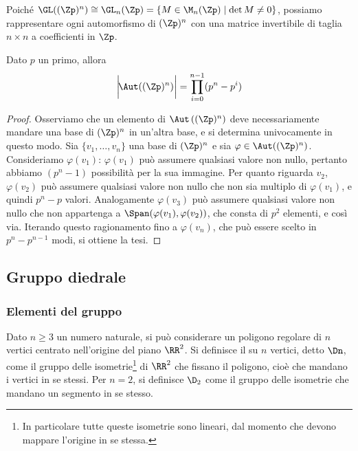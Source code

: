 \documentclass[11pt]{scrartcl}
\begin{document}
	Poiché $\GL((\Zp)^n) \cong \GL_n(\Zp) = \{M \in \M_{n}(\Zp)\mid \det M \neq 0\}$,
	possiamo rappresentare ogni automorfismo di $(\Zp)^n$ con una matrice invertibile
	di taglia $n\times n$ a coefficienti in $\Zp$.
	
	\begin{proposition}
		Dato $p$ un primo, allora \[
		\bigg| \! \Aut((\Zp)^n) \bigg| = \prod_{i = 0}^{n - 1} (p^n - p^i)
		\]
	\end{proposition}
	
	\begin{proof}
		Osserviamo che un elemento di $\Aut\left((\Zp)^n\right)$ deve necessariamente mandare 
		una base di $(\Zp)^n$ in un'altra base, e si determina univocamente in questo 
		modo. Sia $\{v_1, \ldots, v_n\}$ una base di $(\Zp)^n$ e sia $\varphi \in 
		\Aut((\Zp)^n)$. Consideriamo $\varphi(v_1)$: $\varphi(v_1)$ può assumere
		qualsiasi valore non nullo, pertanto abbiamo $(p^n - 1)$ possibilità per 
		la sua immagine. Per quanto riguarda $v_2$, $\varphi(v_2)$
		può assumere qualsiasi valore non nullo che non sia multiplo di $\varphi(v_1)$, e quindi
		$p^n - p$ valori. Analogamente $\varphi(v_3)$ può assumere qualsiasi
		valore non nullo che non appartenga a $\Span(\varphi(v_1), \varphi(v_2))$, che consta di
		$p^2$ elementi, e così via. Iterando questo ragionamento fino a $\varphi(v_n)$,
		che può essere scelto in $p^n - p^{n - 1}$ modi, si ottiene la tesi.
	\end{proof}
	
	\newpage
	
	\subsection{Gruppo diedrale}
	
	\subsubsection{Elementi del gruppo}
	
	\begin{definition}
		Dato $n \geq 3$ un numero naturale, si può considerare un poligono regolare di $n$ vertici centrato nell'origine del piano $\RR^2$. Si definisce il
		 su $n$ vertici, detto $\Dn$, come il gruppo
		delle isometrie\footnote{
			In particolare tutte queste isometrie sono lineari, dal momento che
			devono mappare l'origine in se stessa.
		} di $\RR^2$ che fissano il poligono, cioè che mandano i 
		vertici in se stessi. Per $n = 2$, si definisce $\D_2$ come il gruppo delle
		isometrie che mandano un segmento in se stesso.
	\end{definition}
	
\end{document}

